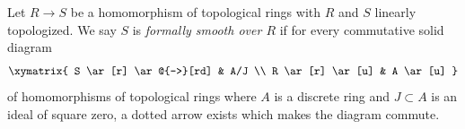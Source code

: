 \begin{definition}
\label{definition-formally-smooth}
Let $R \to S$ be a homomorphism of topological rings with $R$ and $S$
linearly topologized. We say $S$ is {\it formally smooth over $R$} if
for every commutative solid diagram
$$
\xymatrix{
S \ar[r] \ar@{-->}[rd] & A/J \\
R \ar[r] \ar[u] & A \ar[u]
}
$$
of homomorphisms of topological rings where $A$ is a discrete ring and
$J \subset A$ is an ideal of square zero, a dotted arrow exists which
makes the diagram commute.
\end{definition}